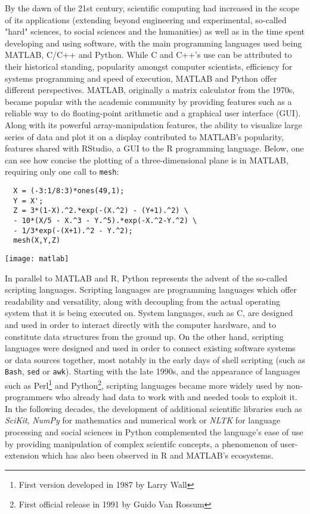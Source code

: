 By the dawn of the 21st century, scientific computing had increased in the scope of its applications (extending beyond engineering and experimental, so-called "hard" sciences, to social sciences and the humanities) as well as in the time spent developing and using software\cite{prabhu_survey_2011}\cite{hannay_how_2009}, with the main programming languages used being MATLAB, C/C++ and Python. While C and C++'s use can be attributed to their historical standing, popularity amongst computer scientists, efficiency for systems programming and speed of execution, MATLAB and Python offer different perspectives. MATLAB, originally a matrix calculator from the 1970s, became popular with the academic community by providing features such as a reliable way to do floating-point arithmetic and a graphical user interface (GUI). Along with its powerful array-manipulation features, the ability to visualize large series of data and plot it on a display contributed to MATLAB's popularity\cite{moler_history_2020}, features shared with RStudio, a GUI to the R programming language. Below, one can see how concise the plotting of a three-dimensional plane is in MATLAB, requiring only one call to \lstinline{mesh}:

\begin{lstlisting}
  X = (-3:1/8:3)*ones(49,1);
  Y = X';
  Z = 3*(1-X).^2.*exp(-(X.^2) - (Y+1).^2) \
  - 10*(X/5 - X.^3 - Y.^5).*exp(-X.^2-Y.^2) \
  - 1/3*exp(-(X+1).^2 - Y.^2);
  mesh(X,Y,Z)
\end{lstlisting}

\texttt{[image: matlab]}

In parallel to MATLAB and R, Python represents the advent of the so-called scripting languages. Scripting languages are programming  languages which offer readability and versatility, along with decoupling from the actual operating system that it is being executed on. System languages, such as C, are designed and used in order to interact directly with the computer hardware, and to constitute data structures from the ground up\cite{ousterhout_scripting_1998}. On the other hand, scripting languages were designed and used in order to connect existing software systems or data sources together, most notably in the early days of shell scripting (such as \lstinline{Bash}, \lstinline{sed} or \lstinline{awk}). Starting with the late 1990s, and the appearance of languages such as Perl\footnote{First version developed in 1987 by Larry Wall} and Python\footnote{First official release in 1991 by Guido Van Rossum}, scripting languages became more widely used by non-programmers who already had data to work with and needed tools to exploit it. In the following decades, the development of additional scientific libraries such as \emph{SciKit}, \emph{NumPy} for mathematics and numerical work or \emph{NLTK} for language processing and social sciences in Python complemented the language's ease of use by providing manipulation of complex scientifc concepts\cite{millman_python_2011}, a phenomenon of user-extension which has also been observed in R and MATLAB's ecosystems\cite{moler_history_2020}.

